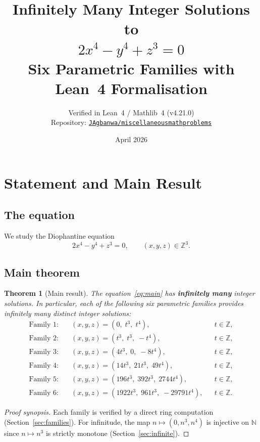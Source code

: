 \documentclass[12pt,a4paper]{article}
\title{%
  \Large\bfseries Infinitely Many Integer Solutions to\\[6pt]
  \Huge $2x^4 - y^4 + z^3 = 0$\\[10pt]
  \large Six Parametric Families with Lean~4 Formalisation
}
\author{%
  \normalsize Verified in Lean~4 / Mathlib~4 (v4.21.0)\\[2pt]
  \normalsize Repository: \href{https://github.com/JAgbanwa/miscellaneousmathproblems}%
    {\texttt{JAgbanwa/miscellaneousmathproblems}}
}
\date{\normalsize April 2026}
\newtheorem{theorem}{Theorem}[section]
\theoremstyle{definition}
\newcommand{\Z}{\mathbb{Z}}
\newcommand{\N}{\mathbb{N}}
\begin{document}
\maketitle
\tableofcontents
\newpage

\section{Statement and Main Result}\label{sec:intro}

\subsection{The equation}

We study the Diophantine equation
\begin{equation}\label{eq:main}
  2x^4 - y^4 + z^3 = 0, \qquad (x,y,z)\in\Z^3. \tag{$\star$}
\end{equation}

\subsection{Main theorem}

\begin{theorem}[Main result]\label{thm:main}
  The equation~\eqref{eq:main} has \textbf{infinitely many} integer solutions.
  In particular, each of the following six parametric families provides infinitely many
  distinct integer solutions:
  \begin{align}
    \text{Family 1:} &\quad (x,y,z) = (0,\; t^3,\; t^4), && t \in \Z,\label{eq:fam1}\\
    \text{Family 2:} &\quad (x,y,z) = (t^3,\; t^3,\; -t^4), && t \in \Z,\label{eq:fam2}\\
    \text{Family 3:} &\quad (x,y,z) = (4t^3,\; 0,\; -8t^4), && t \in \Z,\label{eq:fam3}\\
    \text{Family 4:} &\quad (x,y,z) = (14t^3,\; 21t^3,\; 49t^4), && t \in \Z,\label{eq:fam4}\\
    \text{Family 5:} &\quad (x,y,z) = (196t^3,\; 392t^3,\; 2744t^4), && t \in \Z,\label{eq:fam5}\\
    \text{Family 6:} &\quad (x,y,z) = (1922t^3,\; 961t^3,\; -29791t^4), && t \in \Z.\label{eq:fam6}
  \end{align}
\end{theorem}

\begin{proof}[Proof synopsis]
  Each family is verified by a direct ring computation (Section~\ref{sec:families}).
  For infinitude, the map $n \mapsto (0, n^3, n^4)$ is injective on $\N$ since
  $n \mapsto n^3$ is strictly monotone (Section~\ref{sec:infinite}).
\end{proof}
\end{document}
